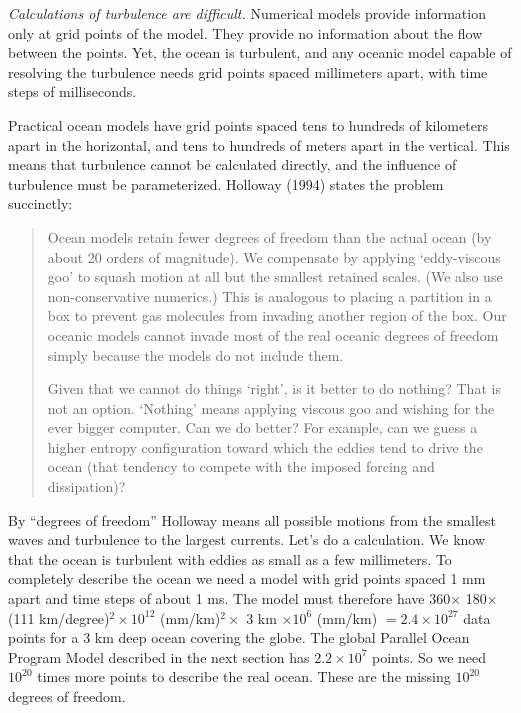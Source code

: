 \textit{Calculations of turbulence are difficult.} Numerical
models provide information only at grid points of the model. They provide no information about
the flow between the points. Yet, the ocean is turbulent, and any oceanic model
capable of resolving the turbulence needs grid points spaced millimeters apart,
with time steps of milliseconds.

Practical ocean models have grid points spaced tens to hundreds of kilometers
apart in the horizontal, and tens to hundreds of meters apart in the vertical.
This means that turbulence cannot be calculated directly, and
the influence of turbulence must be parameterized. Holloway (1994) states the
problem succinctly:

\begin{quotation} \small
Ocean models retain fewer degrees of freedom than the actual ocean (by about 20
orders of magnitude). We compensate by applying `eddy-viscous goo' to squash
motion at all but the smallest retained scales. (We also use non-conservative
numerics.) This is analogous to placing a partition in a box to prevent gas
molecules from invading another region of the box. Our oceanic models cannot
invade most of the real oceanic degrees of freedom simply because the models do
not include them.

Given that we cannot do things `right', is it better to do nothing? That is not
an option. `Nothing' means applying viscous goo and wishing for the ever bigger
computer. Can we do better? For example, can we guess a higher entropy
configuration toward which the eddies tend to drive the ocean (that tendency
to compete with the imposed forcing and dissipation)?
\end{quotation}

By ``degrees of freedom'' Holloway means all possible motions from the smallest
waves and turbulence to the largest currents. Let's do a calculation.
We know that the ocean is turbulent with eddies as small as a few millimeters. To
completely describe the ocean we need a model with grid points spaced 1 mm apart and
time steps of about 1 ms. The model must therefore have 360\degrees $\times$
180\degrees $\times$ (111 km/degree)$^2 \times 10^{12}$ (mm/km)$^2 \times$ 3 km
$\times 10^6$ (mm/km) $= 2.4 \times 10^{27}$ data points for a 3 km deep ocean
covering the globe. The global Parallel Ocean Program Model described in the next
section has
$2.2
\times 10^7$ points. So we need $10^{20}$ times more points to describe the real
ocean. These are the missing $10^{20}$ degrees of freedom.

